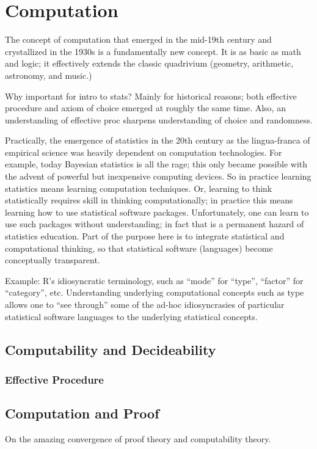 \part{Computation}

The concept of computation that emerged in the mid-19th century and
crystallized in the 1930s is a fundamentally new concept.  It is as
basic as math and logic; it effectively extends the classic quadrivium
(geometry, arithmetic, astronomy, and music.)

\begin{remark}
  Why important for intro to stats?  Mainly for historical reasons;
  both effective procedure and axiom of choice emerged at roughly the
  same time.  Also, an understanding of effective proc sharpens
  understanding of choice and randomness.

  Practically, the emergence of statistics in the 20th century as the
  lingua-franca of empirical science was heavily dependent on
  computation technologies.  For example, today Bayesian statistics is
  all the rage; this only became possible with the advent of powerful
  but inexpensive computing devices.  So in practice learning
  statistics means learning computation techniques.  Or, learning to
  think statistically requires skill in thinking computationally; in
  practice this means learning how to use statistical software
  packages.  Unfortunately, one can learn to use such packages without
  understanding; in fact that is a permanent hazard of statistics
  education.  Part of the purpose here is to integrate statistical and
  computational thinking, so that statistical software (languages)
  become conceptually transparent.

  Example: R's idiosyncratic terminology, such as ``mode'' for
  ``type'', ``factor'' for ``category'', etc.  Understanding
  underlying computational concepts such as type allows one to ``see
  through'' some of the ad-hoc idiosyncrasies of particular
  statistical software languages to the underlying statistical
  concepts.
\end{remark}


\chapter{Computability and Decideability}

\section{Effective Procedure}


\chapter{Computation and Proof}

On the amazing convergence of proof theory and computability theory.

